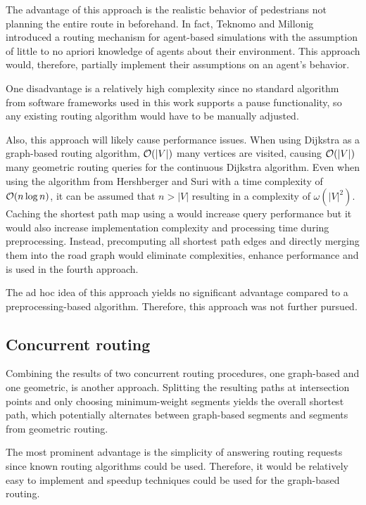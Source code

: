 		The advantage of this approach is the realistic behavior of pedestrians not planning the entire route in beforehand.
		In fact, Teknomo and Millonig introduced a routing mechanism for agent-based simulations with the assumption of little to no apriori knowledge of agents about their environment\cite{teknomo-millonig-routing}.
		This approach would, therefore, partially implement their assumptions on an agent's behavior.
		
		One disadvantage is a relatively high complexity since no standard algorithm from software frameworks used in this work supports a pause functionality, so any existing routing algorithm would have to be manually adjusted.

		Also, this approach will likely cause performance issues.
		When using Dijkstra as a graph-based routing algorithm, $\mathcal{O}(|V|)$ many vertices are visited, causing $\mathcal{O}(|V|)$ many geometric routing queries for the continuous Dijkstra algorithm.
		Even when using the algorithm from Hershberger and Suri\cite{hershberger-suri} with a time complexity of $\mathcal{O}(n \log n)$, it can be assumed that $n > |V|$ resulting in a complexity of $\omega(|V|^2)$.
		Caching the shortest path map using a  would increase query performance but it would also increase implementation complexity and processing time during preprocessing.
		Instead, precomputing all shortest path edges and directly merging them into the road graph would eliminate complexities, enhance performance and is used in the fourth approach.
		
		The ad hoc idea of this approach yields no significant advantage compared to a preprocessing-based algorithm.
		Therefore, this approach was not further pursued.
	
	\subsection{Concurrent routing}
	
		Combining the results of two concurrent routing procedures, one graph-based and one geometric, is another approach.
		Splitting the resulting paths at intersection points and only choosing minimum-weight segments yields the overall shortest path, which potentially alternates between graph-based segments and segments from geometric routing.
		
		The most prominent advantage is the simplicity of answering routing requests since known routing algorithms could be used.
		Therefore, it would be relatively easy to implement and speedup techniques could be used for the graph-based routing.
		
